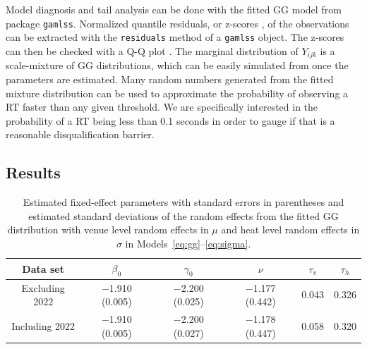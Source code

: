 \documentclass[12pt, letterpaper]{article}
\begin{document}
Model diagnosis and tail analysis can be done with the fitted GG model
from package \texttt{gamlss}. Normalized quantile residuals, or
z-scores \citep{dunn1996randomized}, of the observations can be
extracted with the \texttt{residuals} method of a \texttt{gamlss}
object. The z-scores can then be checked with a Q-Q plot
\citep{almeida2018ggplot2}. The marginal
distribution of $Y_{ijk}$ is a scale-mixture of GG distributions, which can be
easily simulated from once the parameters are estimated. Many
random numbers generated from the fitted mixture distribution can be used to
approximate the probability of observing a RT faster than any given
threshold. We are specifically interested in the probability of a RT
being less than 0.1 seconds in order to gauge if that is a reasonable
disqualification barrier.


\subsection{Results}
\label{sec:results_barrier}

\begin{table}[b]
  \centering
  \caption{Estimated fixed-effect parameters with standard errors in
    parentheses and estimated standard deviations of the random effects from the
    fitted GG distribution with venue level random
    effects in $\mu$ and heat level random effects in $\sigma$ in
    Models~\eqref{eq:gg}--\eqref{eq:sigma}.}
  \label{tab:ggfit}
  \begin{tabular}{c c c c c c}
    \toprule
    Data set & $\beta_0$ & $\gamma_0$ & $\nu$ & $\tau_v$ & $\tau_h$ \\
    \midrule
    Excluding 2022 & $-$1.910 (0.005) & $-$2.200 (0.025) & $-$1.177 (0.442) & 0.043 & 0.326 \\
    Including 2022 & $-$1.910 (0.005) & $-$2.200 (0.027) & $-$1.178 (0.447) & 0.058 & 0.320 \\
    \bottomrule
  \end{tabular}
\end{table}
\end{document}
